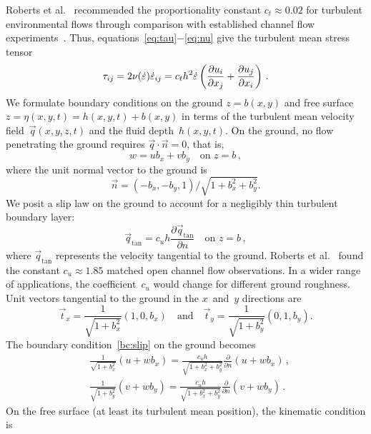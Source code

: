 \documentclass[a5paper,12pt]{article}
\newcommand{\ros}{{\dot\varepsilon}}
\begin{document}
Roberts et al.~\cite{Roberts2008} recommended the proportionality constant $c_t\approx0.02$ for turbulent environmental flows through comparison with established channel flow experiments~\cite[e.g.]{Nezu2005}.
Thus, equations~\eqref{eq:tau}$-$\eqref{eq:nu} give the turbulent mean stress tensor
\begin{equation}
\tau_{ij}=2\nu(\ros)\ros_{ij}=c_th^2\ros\left( \D{x_j}{u_i} +\D{x_i}{u_j}\right) \,.\label{eq:stress}
\end{equation}
We formulate boundary conditions on the ground $z=b(x,y)$ and free surface $z=\eta(x,y,t)=h(x,y,t)+b(x,y)$ in terms of the turbulent mean velocity field~$\vec q(x,y,z,t)$ and the fluid depth~$h(x,y,t)$. 
On the ground, no flow penetrating the ground requires $\vec q\cdot\vec n=0$, that is,
\begin{equation}
w=ub_x+vb_y \quad\text{on } z=b\,,
\label{eq:nopen}
\end{equation}
where the unit normal vector to the ground is
\begin{equation}
\vec n=(-b_x,-b_y,1)/\sqrt{1+b_x^2+b_y^2}.
\label{eq:vecn}
\end{equation} 
We posit a slip law on the ground to account for a negligibly thin turbulent boundary layer:
\begin{equation}
\vec q_{\text{tan}}=c_uh\frac{\partial\vec q_{\text{tan}}}{\partial n} \quad\text{on } z=b\,,
\label{bc:slip}
\end{equation} 
where $\vec q_{\text{tan}}$ represents the velocity tangential to the ground. 
Roberts et al.~\cite{Roberts2008} found the constant $c_u\approx1.85$ matched open channel flow observations. 
In a wider range of applications, the coefficient~$c_u$ would change for different ground roughness. 
Unit vectors tangential to the ground in the $x$~and~$y$ directions are
\begin{equation*}
\vec t_x=\frac{1}{\sqrt{1+b_x^2}}(1,0,b_x)
\quad\text{and}\quad
\vec t_y=\frac{1}{\sqrt{1+b_y^2}}(0,1,b_y).
\end{equation*}
The boundary condition~\eqref{bc:slip} on the ground becomes
\begin{align}&
\frac{1}{\sqrt{1+b_x^2}}(u+wb_x)=\frac{c_uh}{\sqrt{1+b_x^2+b_y^2}}\frac{\partial}{\partial n}(u+wb_x)\,,\label{slip:u}\\&
\frac{1}{\sqrt{1+b_y^2}}(v+wb_y)=\frac{c_uh}{\sqrt{1+b_x^2+b_y^2}}\frac{\partial}{\partial n}(v+wb_y)\,.\label{slip:v}
\end{align}
On the free surface (at least its turbulent mean position), the kinematic condition is 
\end{document}
